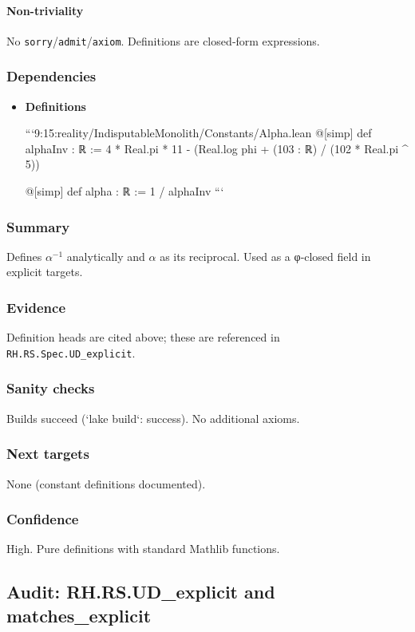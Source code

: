 \documentclass{article}
\begin{document}
\paragraph{Non-triviality}
No \texttt{sorry}/\texttt{admit}/\texttt{axiom}. Definitions are closed‑form expressions.

\subsubsection{Dependencies}
\begin{itemize}[leftmargin=*]
  \item \textbf{Definitions}

```9:15:reality/IndisputableMonolith/Constants/Alpha.lean
@[simp] def alphaInv : ℝ :=
  4 * Real.pi * 11 - (Real.log phi + (103 : ℝ) / (102 * Real.pi ^ 5))

@[simp] def alpha : ℝ := 1 / alphaInv
```
\end{itemize}

\subsubsection{Summary}
Defines \(\alpha^{-1}\) analytically and \(\alpha\) as its reciprocal. Used as a φ‑closed field in explicit targets.

\subsubsection{Evidence}
Definition heads are cited above; these are referenced in \texttt{RH.RS.Spec.UD\_explicit}.

\subsubsection{Sanity checks}
Builds succeed (`lake build`: success). No additional axioms.

\subsubsection{Next targets}
None (constant definitions documented).

\subsubsection{Confidence}
High. Pure definitions with standard Mathlib functions.

\subsection{Audit: RH.RS.UD\_explicit and matches\_explicit}
\end{document}

